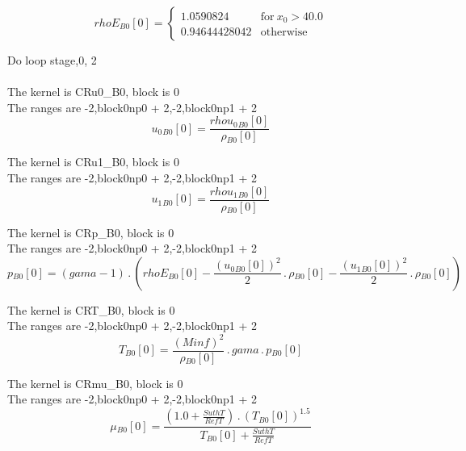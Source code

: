\documentclass{article}
\begin{document}
\begin{dmath}{rhoE{_{B0}}}[{0}] = \begin{cases} 1.0590824 & \text{for}\: x_{0} > 40.0 \\0.94644428042 & \text{otherwise} \end{cases}\end{dmath}

\noindent Do loop stage,0, 2\\
\\\noindent The kernel is CRu0_B0, block is 0\\\noindent The ranges are -2,block0np0 + 2,-2,block0np1 + 2\\\begin{dmath}{u_{0}{_{B0}}}[{0}] = \frac{{rhou_{0}{_{B0}}}[{0}]}{{\rho{_{B0}}}[{0}]}\end{dmath}

\noindent The kernel is CRu1_B0, block is 0\\\noindent The ranges are -2,block0np0 + 2,-2,block0np1 + 2\\\begin{dmath}{u_{1}{_{B0}}}[{0}] = \frac{{rhou_{1}{_{B0}}}[{0}]}{{\rho{_{B0}}}[{0}]}\end{dmath}

\noindent The kernel is CRp_B0, block is 0\\\noindent The ranges are -2,block0np0 + 2,-2,block0np1 + 2\\\begin{dmath}{p{_{B0}}}[{0}] = \left(gama - 1\right) \,.\, \left({rhoE{_{B0}}}[{0}] - \frac{\left({u_{0}{_{B0}}}[{0}] \right)^{2}}{2} \,.\, {\rho{_{B0}}}[{0}] - \frac{\left({u_{1}{_{B0}}}[{0}] \right)^{2}}{2} \,.\, 
{\rho{_{B0}}}[{0}]\right)\end{dmath}

\noindent The kernel is CRT_B0, block is 0\\\noindent The ranges are -2,block0np0 + 2,-2,block0np1 + 2\\\begin{dmath}{T{_{B0}}}[{0}] = \frac{\left(Minf \right)^{2}}{{\rho{_{B0}}}[{0}]} \,.\, gama \,.\, {p{_{B0}}}[{0}]\end{dmath}

\noindent The kernel is CRmu_B0, block is 0\\\noindent The ranges are -2,block0np0 + 2,-2,block0np1 + 2\\\begin{dmath}{\mu{_{B0}}}[{0}] = \frac{\left(1.0 + \frac{SuthT}{RefT}\right) \,.\, \left({T{_{B0}}}[{0}] \right)^{1.5}}{{T{_{B0}}}[{0}] + \frac{SuthT}{RefT}}\end{dmath}
\end{document}
